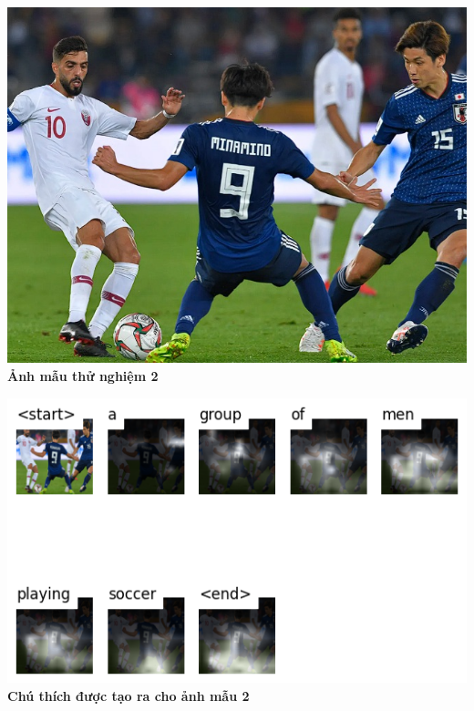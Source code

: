 \documentclass[conference]{IEEEtran}
\begin{document}
\vspace{1cm}

\begin{center}
    \begin{minipage}[b]{0.48\textwidth}
        \centering
        \includegraphics[width=\linewidth]{attachments/test01.jpg}
        \vspace{0.2cm}
        \textbf{Ảnh mẫu thử nghiệm 2}
    \end{minipage}
    \hfill
    \begin{minipage}[b]{0.48\textwidth}
        \centering
        \includegraphics[width=\linewidth]{attachments/test01_caption.jpg}
        \vspace{0.2cm}
        \textbf{Chú thích được tạo ra cho ảnh mẫu 2}
    \end{minipage}
\end{center}
\end{document}
